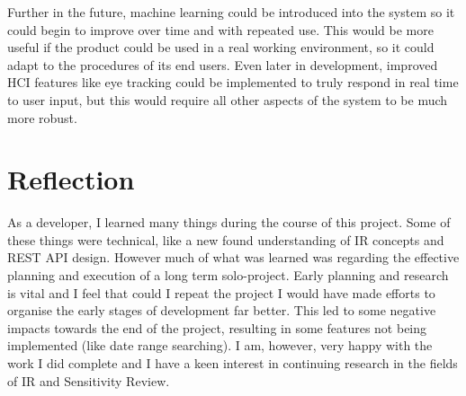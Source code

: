 \documentclass{l4proj}
\begin{document}
Further in the future, machine learning could be introduced into the system so it could begin to improve over time and with repeated use. This would be more useful if the product could be used in a real working environment, so it could adapt to the procedures of its end users.
Even later in development, improved HCI features like eye tracking could be implemented to truly respond in real time to user input, but this would require all other aspects of the system to be much more robust.

\section{Reflection}
As a developer, I learned many things during the course of this project. Some of these things were technical, like a new found understanding of IR concepts and REST API design. However much of what was learned was regarding the effective planning and execution of a long term solo-project. Early planning and research is vital and I feel that could I repeat the project I would have made efforts to organise the early stages of development far better. This led to some negative impacts towards the end of the project, resulting in some features not being implemented (like date range searching). I am, however, very happy with the work I did complete and I have a keen interest in continuing research in the fields of IR and Sensitivity Review.
\end{document}
